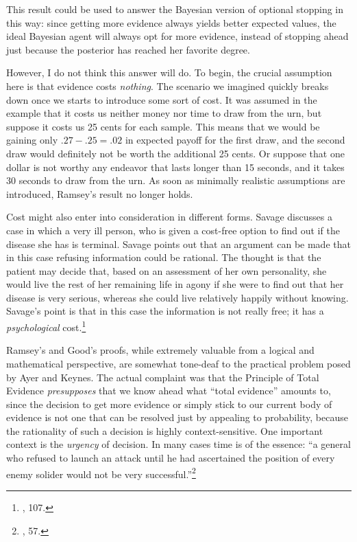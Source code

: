 This result could be used to answer the Bayesian version of optional
stopping in this way: since getting more evidence always yields better
expected values, the ideal Bayesian agent will always opt for more
evidence, instead of stopping ahead just because the posterior has
reached her favorite degree.

However, I do not think this answer will do. To begin, the crucial
assumption here is that evidence costs \emph{nothing}. The scenario we
imagined quickly breaks down once we starts to introduce some sort of
cost. It was assumed in the example that it costs us neither money nor
time to draw from the urn, but suppose it costs us 25 cents for each
sample. This means that we would be gaining only \(.27-.25 = .02\) in
expected payoff for the first draw, and the second draw would definitely
not be worth the additional 25 cents. Or suppose that one dollar is not
worthy any endeavor that lasts longer than 15 seconds, and it takes 30
seconds to draw from the urn. As soon as minimally realistic assumptions
are introduced, Ramsey's result no longer holds.

Cost might also enter into consideration in different forms. Savage
discusses a case in which a very ill person, who is given a cost-free option
to find out if the disease she has is terminal. Savage points out that an argument can be made that in this case refusing information could be rational. The thought is that the patient
may decide that, based on an assessment of her own personality, she
would live the rest of her remaining life in agony if she were to find
out that her disease is very serious, whereas she could live relatively
happily without knowing. Savage's point is that in this case the
information is not really free; it has a \emph{psychological}
cost.\footnote{\cite{savage}, 107.} 

Ramsey's and Good's proofs, while extremely valuable from a logical and
mathematical perspective, are somewhat tone-deaf to the practical problem
posed by Ayer and Keynes. The actual complaint was that the Principle of
Total Evidence \emph{presupposes} that we know ahead what ``total
evidence'' amounts to, since the decision to get more evidence or simply
stick to our current body of evidence is not one that can be resolved
just by appealing to probability, because the rationality of such a
decision is highly context-sensitive. One important context is the
\emph{urgency} of decision. In many cases time is of the essence: ``a general who refused to
launch an attack until he had ascertained the position of every enemy
solider would not be very successful.''\footnote{\cite{ayerpae}, 57.}

